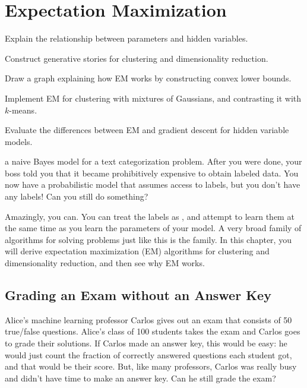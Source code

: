 \chapter{Expectation Maximization} \label{sec:em}


\begin{learningobjectives}
\item Explain the relationship between parameters and hidden
  variables.
\item Construct generative stories for clustering and dimensionality
  reduction.
\item Draw a graph explaining how EM works by constructing convex
  lower bounds.
\item Implement EM for clustering with mixtures of Gaussians, and
  contrasting it with $k$-means.
\item Evaluate the differences between EM and gradient descent for
  hidden variable models.
\end{learningobjectives}

\dependencies{}

 a naive Bayes model for a text
categorization problem.  After you were done, your boss told you that
it became prohibitively expensive to obtain labeled data.  You now
have a probabilistic model that assumes access to labels, but you
don't have any labels!  Can you still do something?

Amazingly, you can.  You can treat the labels as , and attempt to learn them at the same time as you learn
the parameters of your model.  A very broad family of algorithms for
solving problems just like this is the  family.  In this chapter, you will derive expectation
maximization (EM) algorithms for clustering and dimensionality reduction,
and then see why EM works.

\section{Grading an Exam without an Answer Key}

Alice's machine learning professor Carlos gives out an exam that consists of 50 true/false questions.
Alice's class of 100 students takes the exam and Carlos goes to grade their solutions.
If Carlos made an answer key, this would be easy: he would just count the fraction of correctly answered questions each student got, and that would be their score.
But, like many professors, Carlos was really busy and didn't have time to make an answer key.
Can he still grade the exam?

